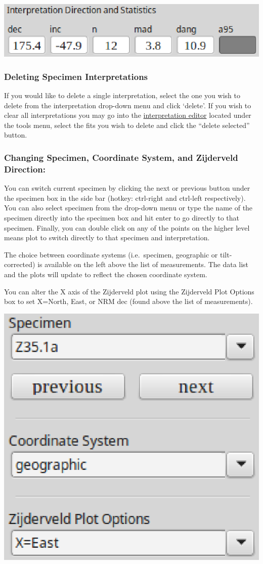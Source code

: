 \documentclass[11pt]{book}
\begin{document}
{{\includegraphics[width=10 cm]{EPSFiles/demag_gui_FitData.eps}

\subsubsection{Deleting Specimen
Interpretations}\label{deleting-specimen-interpretations}

\noindent If you would like to delete a single interpretation, select the one you wish to delete from the interpretation drop-down menu and click `delete'. If you wish to clear all interpretations you may go into the \hyperref[interpretation-editor]{interpretation editor} located under the tools menu, select the fits you wish to delete and click the ``delete selected'' button.\\

\subsubsection{Changing Specimen, Coordinate System, and Zijderveld Direction:}\label{change-specimen-coord-zijd}

You can switch current specimen by clicking the next or previous button under the specimen box in the side bar (hotkey: ctrl-right and ctrl-left respectively). You can also select specimen from the drop-down menu or type the name of the specimen directly into the specimen box and hit enter to go directly to that specimen. Finally, you can double click on any of the points on the higher level means plot to switch directly to that specimen and interpretation.

\noindent The choice between coordinate systems (i.e.~specimen, geographic or tilt-corrected) is available on the left above the list of measurements. The data list and the plots will update to reflect the chosen coordinate system.

\noindent You can alter the X axis of the Zijderveld plot using the Zijderveld Plot Options box to set X=North, East, or NRM dec (found above the list of measurements).

\includegraphics[width=5 cm]{EPSFiles/demag_gui_ProjectionChoice.eps}

}}
\end{document}
